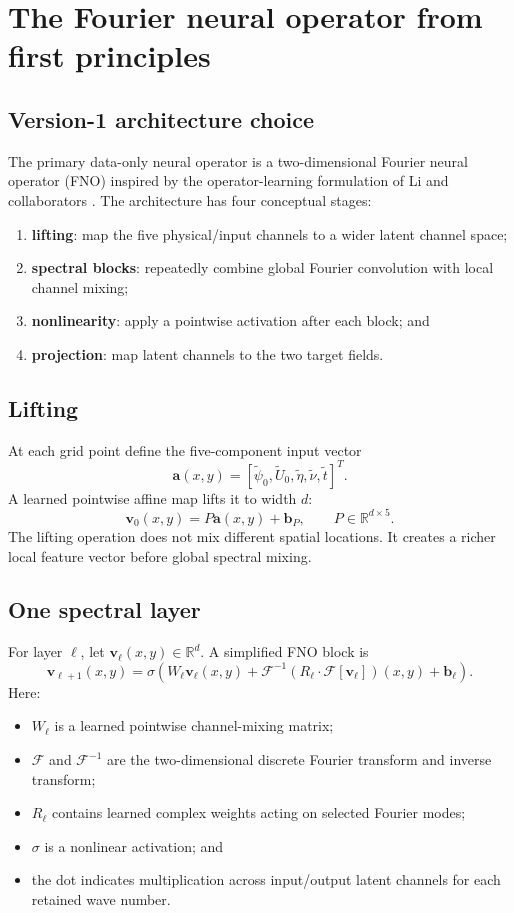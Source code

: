 \documentclass[11pt]{article}
\newcommand{\vect}[1]{\bm{#1}}
\newcommand{\FFT}{\mathcal{F}}
\newcommand{\IFFT}{\mathcal{F}^{-1}}
\begin{document}
\section{The Fourier neural operator from first principles}
\label{sec:fno}

\subsection{Version-1 architecture choice}
The primary data-only neural operator is a two-dimensional Fourier neural operator (FNO) inspired by the operator-learning formulation of Li and collaborators \cite{Li2021}. The architecture has four conceptual stages:
\begin{enumerate}
  \item \textbf{lifting}: map the five physical/input channels to a wider latent channel space;
  \item \textbf{spectral blocks}: repeatedly combine global Fourier convolution with local channel mixing;
  \item \textbf{nonlinearity}: apply a pointwise activation after each block; and
  \item \textbf{projection}: map latent channels to the two target fields.
\end{enumerate}

\subsection{Lifting}
At each grid point define the five-component input vector
\[
\vect a(x,y)=
[\widetilde\psi_0,\widetilde U_0,\widetilde\eta,\widetilde\nu,\widetilde t]^T.
\]
A learned pointwise affine map lifts it to width $d$:
\[
\vect v_0(x,y)=P\vect a(x,y)+\vect b_P,
\qquad P\in\mathbb{R}^{d\times5}.
\]
The lifting operation does not mix different spatial locations. It creates a richer local feature vector before global spectral mixing.

\subsection{One spectral layer}
For layer $\ell$, let $\vect v_\ell(x,y)\in\mathbb{R}^{d}$. A simplified FNO block is
\begin{equation}
\vect v_{\ell+1}(x,y)
=
\sigma\!\left(
W_\ell\vect v_\ell(x,y)
+
\IFFT\!\left(R_\ell\cdot\FFT[\vect v_\ell]\right)(x,y)
+\vect b_\ell
\right).
\label{eq:fno_layer}
\end{equation}
Here:
\begin{itemize}
  \item $W_\ell$ is a learned pointwise channel-mixing matrix;
  \item $\FFT$ and $\IFFT$ are the two-dimensional discrete Fourier transform and inverse transform;
  \item $R_\ell$ contains learned complex weights acting on selected Fourier modes;
  \item $\sigma$ is a nonlinear activation; and
  \item the dot indicates multiplication across input/output latent channels for each retained wave number.
\end{itemize}
\end{document}

